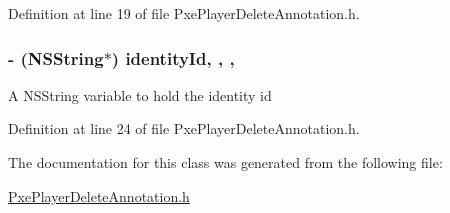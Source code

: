 Definition at line 19 of file Pxe\-Player\-Delete\-Annotation.\-h.

\hypertarget{interface_pxe_player_delete_annotation_a97bf44541b15e60e18679e5fd9485183}{
\subsubsection[{identity\-Id}]{\setlength{\rightskip}{0pt plus 5cm}-\/ (N\-S\-String$\ast$) identity\-Id\hspace{0.3cm}{\ttfamily [read]}, {\ttfamily [write]}, {\ttfamily [nonatomic]}, {\ttfamily [strong]}}}\label{interface_pxe_player_delete_annotation_a97bf44541b15e60e18679e5fd9485183}
A N\-S\-String variable to hold the identity id 

Definition at line 24 of file Pxe\-Player\-Delete\-Annotation.\-h.



The documentation for this class was generated from the following file\-:\begin{DoxyCompactItemize}
\item 
\hyperlink{_pxe_player_delete_annotation_8h}{Pxe\-Player\-Delete\-Annotation.\-h}\end{DoxyCompactItemize}
